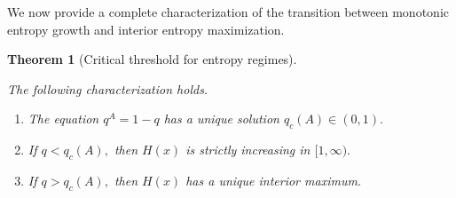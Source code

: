 \documentclass[10pt,a4paper]{amsart}
\newtheorem{thm}{Theorem}[section]
\theoremstyle{definition}
\theoremstyle{remark}
\numberwithin{equation}{section}
\begin{document}
We now provide a complete characterization of the transition between monotonic entropy growth and interior entropy maximization.

\begin{thm}[Critical threshold for entropy regimes]
\label{thm_boundary}

The following characterization holds.

\begin{enumerate}

\item
The equation
$
q^A = 1-q
$
has a unique solution
$
q_c(A)\in(0,1).
$

\item
If
$
q < q_c(A),
$
then
$
H(x)
$
is strictly increasing in
$
[1,\infty).
$

\item
If
$
q > q_c(A),
$
then
$
H(x)
$
has a unique interior maximum.

\end{enumerate}

\end{thm}
\end{document}

